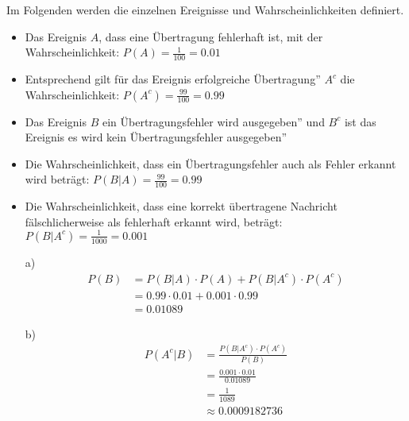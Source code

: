 Im Folgenden werden die einzelnen Ereignisse und Wahrscheinlichkeiten definiert.
\begin{itemize}
	\item Das Ereignis $A$, dass eine Übertragung fehlerhaft ist, mit der Wahrscheinlichkeit: $P(A) = \frac{1}{100} = 0.01$
	\item Entsprechend gilt für das Ereignis \glqq erfolgreiche Übertragung'' $A^c$ die Wahrscheinlichkeit:	$P(A^c) = \frac{99}{100} = 0.99$
	\item Das Ereignis $B$ \glqq ein Übertragungsfehler wird ausgegeben'' und $B^c$ ist das Ereignis \glqq es wird kein Übertragungsfehler ausgegeben''
	\item Die Wahrscheinlichkeit, dass ein Übertragungsfehler auch als Fehler erkannt wird beträgt: $P(B|A) = \frac{99}{100} = 0.99$
	\item Die Wahrscheinlichkeit, dass eine korrekt übertragene Nachricht fälschlicherweise als fehlerhaft erkannt wird, beträgt: $P(B|A^c) = \frac{1}{1000} = 0.001$
\end{itemize}
\begin{enumerate}
	\item[a)]
	\begin{equation*}
		\begin{split}
			P(B) 	&= P(B|A) \cdot P(A) + P(B|A^c) \cdot P(A^c)\\
					&= 0.99 \cdot 0.01 + 0.001 \cdot 0.99\\
					&= 0.01089
		\end{split}
	\end{equation*}
	\item[b)]
	\begin{equation*}
		\begin{split}
			P(A^c|B)&= \frac{P(B|A^c)\cdot P(A^c)}{P(B)}\\
					&= \frac{0.001 \cdot 0.01}{0.01089}\\
					&= \frac{1}{1089}\\
					&\approx 0.0009182736
		\end{split}
	\end{equation*}
\end{enumerate}